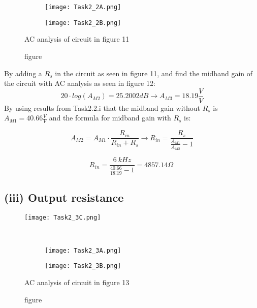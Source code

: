 	\begin{figure}[h]
        \centering
        \begin{subfigure}[h]{0.7\textwidth}
                \texttt{[image: Task2\_2A.png]}
                \label{fig:}
        \end{subfigure}
        \begin{subfigure}[h]{0.25\textwidth}
                \texttt{[image: Task2\_2B.png]}
                \label{fig:}
        \end{subfigure}
        \caption{figure}{AC analysis of circuit in figure 11}
	\end{figure}

	By adding a $R_{s}$ in the circuit as seen in figure 11,  and find the midband gain of the circuit with AC analysis as seen in figure 12:
	$$ 20 \cdot log(A_{M2}) = 25.2002 dB  \rightarrow A_{M3} = 18.19 \frac{V}{V} $$
	By using results from Task2.2.i that the midband gain without $R_{s}$ is $A_{M1} = 40.66 \frac{V}{V}$ and the formula for midband gain with $R_{s}$ is:

	$$ A_{M2} = A_{M1} \cdot \frac{R_{in}}{R_{in} + R_{s}} \rightarrow R_{in} = \frac{R_{s}}{\frac{A_{M1}}{A_{M2}}-1} $$
	
	$$R_{in} = \frac{6\ kHz}{\frac{40.66}{18.19}-1} = 4857.14 \Omega \ $$ 
	\pagebreak

 	\subsection*{(iii) Output resistance}

	\begin{figure}[h!]
	    \centering
	    \texttt{[image: Task2\_3C.png]}
	\end{figure}  \

	\begin{figure}[h]
	    \centering
	    \begin{subfigure}[h]{0.7\textwidth}
	            \texttt{[image: Task2\_3A.png]}
	            \label{fig:}
	    \end{subfigure}
	    \begin{subfigure}[h]{0.25\textwidth}
	            \texttt{[image: Task2\_3B.png]}
	            \label{fig:}
	    \end{subfigure}
	    \caption{figure}{AC analysis of circuit in figure 13}
	\end{figure}

